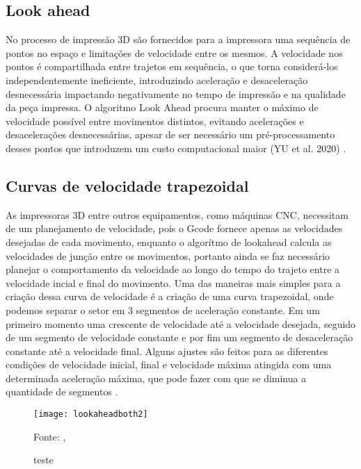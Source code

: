 \subsection{Look ahead}
No processo de impressão 3D são fornecidos para a impressora 
uma sequência de pontos no espaço e limitações de velocidade 
entre os mesmos. A velocidade nos pontos é compartilhada entre 
trajetos em sequência, o que torna considerá-los 
independentemente ineficiente, introduzindo aceleração e 
desaceleração desnecessária impactando negativamente no tempo 
de impressão e na qualidade da peça impressa.
O algoritmo Look Ahead procura manter o máximo de velocidade 
possível entre movimentos distintos, evitando acelerações e 
desacelerações desnecessárias, apesar de ser necessário um 
pré-processamento desses pontos que introduzem um custo 
computacional maior (YU et al. 2020) \cite{yu20, klipperkinematic}.

\subsection{Curvas de velocidade trapezoidal}
As impressoras 3D entre outros equipamentos, como máquinas CNC, necessitam
de um planejamento de velocidade, pois o Gcode fornece apenas as velocidades desejadas
de cada movimento, enquanto o algorítmo de lookahead calcula as velocidades
de junção entre os movimentos, portanto ainda se faz necessário planejar
o comportamento da velocidade ao longo do tempo do trajeto entre a velocidade incial
e final do movimento.
Uma das maneiras mais simples para a criação dessa curva de velocidade é
a criação de uma curva trapezoidal, onde podemos separar o setor em 3 segmentos
de aceleração constante. Em um primeiro momento uma crescente de velocidade até
a velocidade desejada, seguido de um segmento de velocidade constante e por fim
um segmento de desaceleração constante até a velocidade final.
Alguns ajustes são feitos para as diferentes condições de velocidade inicial, final e
velocidade máxima atingida com uma determinada aceleração máxima, que pode
fazer com que se diminua a quantidade de segmentos \cite{yu20,klipperkinematic}.

\begin{figure}[!htb]
    \centering
    \caption{teste}
    \texttt{[image: lookaheadboth2]}

    {\footnotesize Fonte: \citeauthor{klipperkinematic}, \citeyear{klipperkinematic}}
    \label{fig:label9}
\end{figure}

